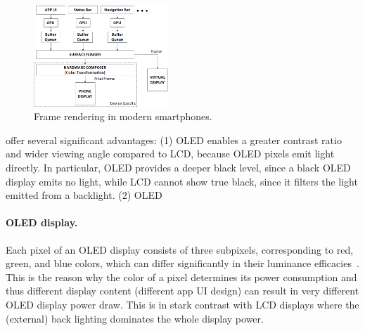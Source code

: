 


\begin{figure}[tp]
  \centering
        \includegraphics[width=0.45\textwidth]{./figure/1400_architecture.png}
        \vspace{-0.1in}
	\caption{Frame rendering in modern smartphones.}
        \vspace{-0.2in}
        \label{fig:arch}
\end{figure}

%
offer several
significant advantages: (1) OLED enables a greater contrast ratio and
wider viewing angle compared to LCD, because OLED pixels emit light
directly. In particular, OLED provides a deeper black level, since a
black OLED display emits no light, while
 LCD cannot show true black, since it filters the light emitted from a backlight.
 (2) OLED
 \fi


\paragraph{OLED display.}
Each pixel of an OLED display consists of three subpixels,
corresponding to red, green, and blue colors, which
can differ significantly in their luminance
efficacies~\cite{oled:2003,oled:2004}.  This is the reason why the color of a pixel determines
its power consumption and thus different display content (\eg different
app UI design) can result in very different OLED display power draw.
This is in stark contrast with LCD displays where the (external) back
lighting dominates the whole display power.

